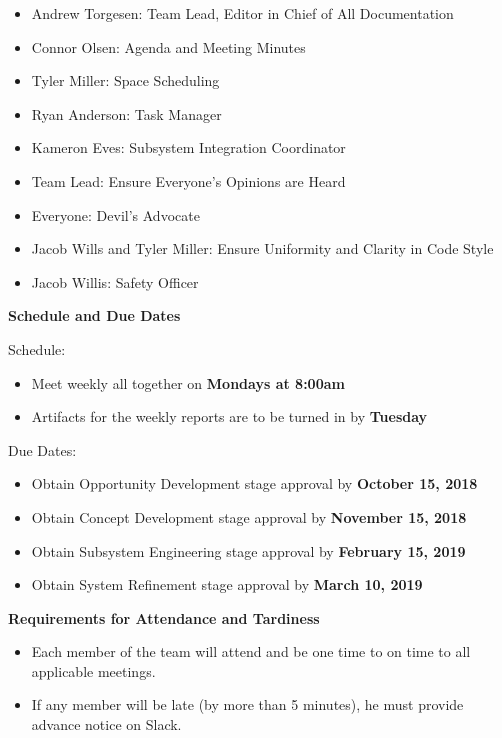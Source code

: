 \begin{itemize}
\item Andrew Torgesen: Team Lead, Editor in Chief of All Documentation
\item Connor Olsen: Agenda and Meeting Minutes
\item Tyler Miller: Space Scheduling
\item Ryan Anderson: Task Manager
\item Kameron Eves: Subsystem Integration Coordinator
\item Team Lead: Ensure Everyone’s Opinions are Heard
\item Everyone: Devil’s Advocate
\item Jacob Wills and Tyler Miller: Ensure Uniformity and Clarity in Code Style
\item Jacob Willis: Safety Officer
\end{itemize}

\textbf{Schedule and Due Dates}

Schedule:

\begin{itemize}
\item Meet weekly all together on \textbf{Mondays at 8:00am}
\item Artifacts for the weekly reports are to be turned in by \textbf{Tuesday}
\end{itemize}

Due Dates:

\begin{itemize}
\item Obtain Opportunity Development stage approval by \textbf{October 15, 2018}
\item Obtain Concept Development stage approval by \textbf{November 15, 2018}
\item Obtain Subsystem Engineering stage approval by \textbf{February 15, 2019}
\item Obtain System Refinement stage approval by \textbf{March 10, 2019}
\end{itemize}

\textbf{Requirements for Attendance and Tardiness}

\begin{itemize}
\item Each member of the team will attend and be one time to on time to all applicable meetings.
\item If any member will be late (by more than 5 minutes), he must provide advance notice on Slack.
\end{itemize}


